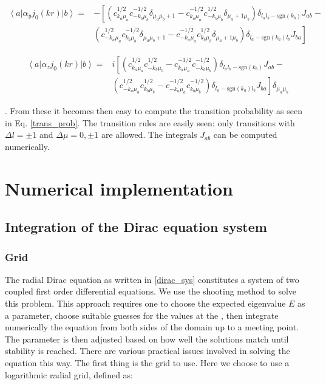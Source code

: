 \documentclass[]{report}
\newcommand{\bra}[1]{\left<#1\right|}
\newcommand{\ket}[1]{\left|#1\right>}
\newcommand{\braket}[3]{\bra{#1}#2\ket{#3}}
\begin{document}
\begin{align}\label{matel_alphayj0}
\braket{a}{\alpha_yj_0(kr)}{b} = & -\left[\left(c_{k_a\mu_a}^{1/2} c_{-k_b\mu_b}^{-1/2}\delta_{\mu_a\mu_b+1}
- c_{k_a\mu_a}^{-1/2} c_{-k_b\mu_b}^{1/2}\delta_{\mu_a+1\mu_b}\right)
\delta_{l_al_b-\mathrm{sgn}(k_b)} J_{ab}  - \right. \\
&\left. 
\left(c_{-k_a\mu_a}^{1/2} c_{k_b\mu_b}^{-1/2}\delta_{\mu_a\mu_b+1}
- c_{-k_a\mu_a}^{-1/2} c_{k_b\mu_b}^{1/2}\delta_{\mu_a+1\mu_b}\right)
\delta_{l_a-\mathrm{sgn}(k_a)l_b} J_{ba} 
\right] \nonumber
\end{align}

\begin{align}\label{matel_alphazj0}
\braket{a}{\alpha_zj_0(kr)}{b} = & i\left[\left(c_{k_a\mu_a}^{1/2} c_{-k_b\mu_b}^{1/2}-
 c_{k_a\mu_a}^{-1/2} c_{-k_b\mu_b}^{-1/2}\right)
\delta_{l_al_b-\mathrm{sgn}(k_b)} J_{ab}  - \right. \\
&\left. 
\left(c_{-k_a\mu_a}^{1/2} c_{k_b\mu_b}^{1/2}-
c_{-k_a\mu_a}^{-1/2} c_{k_b\mu_b}^{-1/2}\right)\delta_{l_a-\mathrm{sgn}(k_a)l_b} J_{ba} 
\right]\delta_{\mu_a\mu_b} \nonumber
\end{align}

. From these it becomes then easy to compute the transition probability as seen in Eq. \ref{trans_prob}. The transition rules are easily seen: only transitions with $\Delta l = \pm 1$ and $\Delta \mu = 0, \pm1$ are allowed. The integrals $J_{ab}$ can be computed numerically.

\chapter{Numerical implementation}

\section{Integration of the Dirac equation system}

\subsection{Grid}

The radial Dirac equation as written in \ref{dirac_sys} constitutes a system of two coupled first order differential equations. We use the shooting method to solve this problem. This approach requires one to choose the expected eigenvalue $E$ as a parameter, choose suitable guesses for the values at the 
, then integrate numerically the equation from both sides of the domain up to a meeting point. The parameter is then adjusted based on how well the solutions match until stability is reached.\newline
There are various practical issues involved in solving the equation this way. The first thing is the grid to use. Here we choose to use a logarithmic radial grid, defined as:
\end{document}
